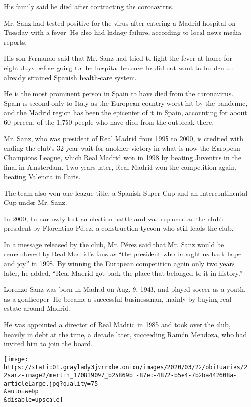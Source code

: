 His family said he died after contracting the coronavirus.

Mr. Sanz had tested positive for the virus after entering a Madrid
hospital on Tuesday with a fever. He also had kidney failure, according
to local news media reports.

His son Fernando said that Mr. Sanz had tried to fight the fever at home
for eight days before going to the hospital because he did not want to
burden an already strained Spanish health-care system.

He is the most prominent person in Spain to have died from the
coronavirus. Spain is second only to Italy as the European country worst
hit by the pandemic, and the Madrid region has been the epicenter of it
in Spain, accounting for about 60 percent of the 1,750 people who have
died from the outbreak there.

Mr. Sanz, who was president of Real Madrid from 1995 to 2000, is
credited with ending the club's 32-year wait for another victory in what
is now the European Champions League, which Real Madrid won in 1998 by
beating Juventus in the final in Amsterdam. Two years later, Real Madrid
won the competition again, beating Valencia in Paris.

The team also won one league title, a Spanish Super Cup and an
Intercontinental Cup under Mr. Sanz.

In 2000, he narrowly lost an election battle and was replaced as the
club's president by Florentino Pérez, a construction tycoon who still
leads the club.

In a
\href{https://www.realmadrid.com/noticias/2020/03/22/declaracion-del-presidente-florentino-perez-sobre-lorenzo-sanz}{message}
released by the club, Mr. Pérez said that Mr. Sanz would be remembered
by Real Madrid's fans as ``the president who brought us back hope and
joy'' in 1998. By winning the European competition again only two years
later, he added, ``Real Madrid got back the place that belonged to it in
history.''

Lorenzo Sanz was born in Madrid on Aug. 9, 1943, and played soccer as a
youth, as a goalkeeper. He became a successful businessman, mainly by
buying real estate around Madrid.

He was appointed a director of Real Madrid in 1985 and took over the
club, heavily in debt at the time, a decade later, succeeding Ramón
Mendoza, who had invited him to join the board.

\texttt{[image: https://static01.graylady3jvrrxbe.onion/images/2020/03/22/obituaries/22sanz-image2/merlin\_170819097\_b25869bf-87ec-4872-b5e4-7b2ba442608a-articleLarge.jpg?quality=75\\\&auto=webp\\\&disable=upscale]}

